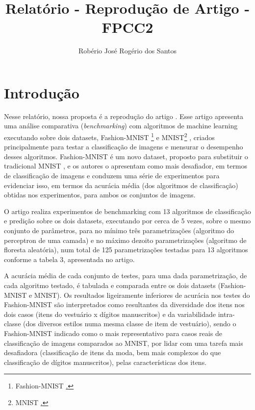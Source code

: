 \documentclass{article}
\title{Relatório - Reprodução de Artigo - FPCC2}
\author{Robério José Rogério dos Santos}
\date{}
\begin{document}
\maketitle

\section{Introdução}

Nesse relatório, nossa proposta é a reprodução do artigo \cite{Xiao2017FashionMNISTAN}. Esse artigo apresenta uma análise comparativa (\textit{benchmarking}) com algoritmos de machine learning executando sobre dois datasets, Fashion-MNIST \footnote{Fashion-MNIST \href{https://t.ly/fH6xG}.}  e  MNIST\footnote{MNIST \href{https://t.ly/6GtJQ}.} , criados principalmente para testar a classificação de imagens e mensurar o desempenho desses algoritmos. Fashion-MNIST é um novo dataset, proposto para substituir o tradicional MNIST \cite{lecun2010mnist}, e os autores o apresentam como mais desafiador, em termos de classificação de imagens e conduzem uma série de experimentos para evidenciar isso, em termos da acurácia média (dos algoritmos de classificação) obtidas nos experimentos, para ambos os conjuntos de imagens. 

O artigo realiza experimentos de benchmarking com 13 algoritmos de classificação e predição sobre os dois datasets, executando por cerca de 5 vezes, sobre o mesmo conjunto de parâmetros, para no mínimo três parametrizações (algoritmo do perceptron de uma camada) e no máximo dezoito parametrizações (algoritmo de floresta aleatória), num total de 125 parametrizações testadas para 13 algoritmos conforme a tabela 3, apresentada no artigo.

A acurácia média de cada conjunto de testes, para uma dada parametrização, de cada algoritmo testado, é tabulada e comparada entre os dois datasets (Fashion-MNIST e MNIST). Os resultados ligeiramente inferiores de acurácia nos testes do Fashion-MNIST são interpretados como resultantes da diversidade dos itens nos dois casos (itens do vestuário x dígitos manuscritos) e da variabilidade intra-classe (dos diversos estilos numa mesma classe de item de vestuário), sendo o Fashion-MNIST indicado como o mais representativo para casos reais de classificação de imagens comparados ao MNIST, por lidar com uma tarefa mais desafiadora (classificação de itens da moda, bem mais complexos do que classificação de dígitos manuscritos), pelas características dos itens.
\end{document}
